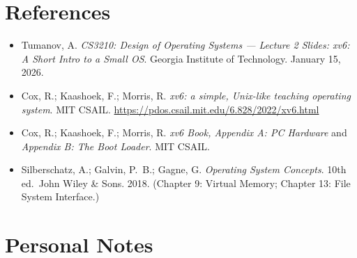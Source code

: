 \documentclass[11pt]{article}
\begin{document}
\section{References}

\begin{itemize}
    \item Tumanov, A. \textit{CS3210: Design of Operating Systems --- Lecture 2 Slides: xv6: A Short Intro to a Small OS}. Georgia Institute of Technology. January 15, 2026.
    \item Cox, R.; Kaashoek, F.; Morris, R. \textit{xv6: a simple, Unix-like teaching operating system}. MIT CSAIL. \url{https://pdos.csail.mit.edu/6.828/2022/xv6.html}
    \item Cox, R.; Kaashoek, F.; Morris, R. \textit{xv6 Book, Appendix A: PC Hardware} and \textit{Appendix B: The Boot Loader}. MIT CSAIL.
    \item Silberschatz, A.; Galvin, P.\ B.; Gagne, G. \textit{Operating System Concepts}. 10th ed.\ John Wiley \& Sons. 2018. (Chapter 9: Virtual Memory; Chapter 13: File System Interface.)
\end{itemize}

\section*{Personal Notes}
\end{document}
